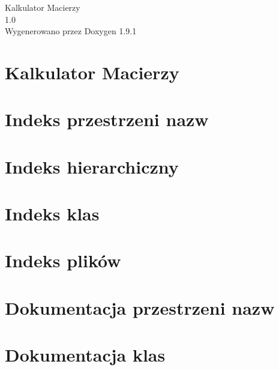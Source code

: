 \let\mypdfximage\pdfximage\def\pdfximage{\immediate\mypdfximage}\documentclass[twoside]{book}
\newcommand{\+}{\discretionary{\mbox{\scriptsize$\hookleftarrow$}}{}{}}
\newcommand{\clearemptydoublepage}{%
  \newpage{\pagestyle{empty}\cleardoublepage}%
}
\begin{document}
\raggedbottom

\begin{titlepage}
\vspace*{7cm}
\begin{center}%
{\Large Kalkulator Macierzy \\[1ex]\large 1.\+0 }\\
\vspace*{1cm}
{\large Wygenerowano przez Doxygen 1.9.1}\\
\end{center}
\end{titlepage}
\clearemptydoublepage
{}
\tableofcontents
\clearemptydoublepage
{}

\chapter{Kalkulator Macierzy}
\label{md__r_e_a_d_m_e}

\chapter{Indeks przestrzeni nazw}

\chapter{Indeks hierarchiczny}

\chapter{Indeks klas}

\chapter{Indeks plików}

\chapter{Dokumentacja przestrzeni nazw}



\chapter{Dokumentacja klas}




\end{document}
